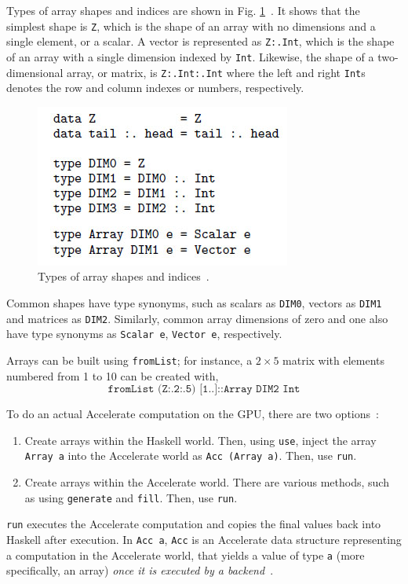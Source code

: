 Types of array shapes and indices are shown in Fig. \ref{fig:acc-types}~\cite{ChaKelLee11}. It shows that the simplest shape is \texttt{Z}, which is the shape of an array with no dimensions and a single element, or a scalar. A vector is represented as \texttt{Z:.Int}, which is the shape of an array with a single dimension indexed by \texttt{Int}. Likewise, the shape of a two-dimensional array, or matrix, is \texttt{Z:.Int:.Int} where the left and right \texttt{Int}s denotes the row and column indexes or numbers, respectively.

\begin{figure}
  \centerline{\includegraphics[width=0.5\linewidth]{accelerate-types.jpg}}
  \caption{Types of array shapes and indices~\cite{ChaKelLee11}.}
  \label{fig:acc-types}
\end{figure}

Common shapes have type synonyms, such as scalars as \texttt{DIM0}, vectors as \texttt{DIM1} and matrices as \texttt{DIM2}. Similarly, common array dimensions of zero and one also have type synonyms as \texttt{Scalar e}, \texttt{Vector e}, respectively.

Arrays can be built using \texttt{fromList}; for instance, a $2 \times 5$ matrix with elements numbered from 1 to 10 can be created with,
$$\texttt{fromList (Z:.2:.5) [1..]::Array DIM2 Int}$$

To do an actual Accelerate computation on the GPU, there are two options~\cite{Mar13}:
\begin{enumerate}
\item Create arrays within the Haskell world. Then, using \texttt{use}, inject the array \texttt{Array a} into the Accelerate world as \texttt{Acc (Array a)}. Then, use \texttt{run}.
\item Create arrays within the Accelerate world. There are various methods, such as using \texttt{generate} and \texttt{fill}. Then, use \texttt{run}.
\end{enumerate}
\texttt{run} executes the Accelerate computation and copies the final values back into Haskell after execution. In \texttt{Acc a}, \texttt{Acc} is an Accelerate data structure representing a computation in the Accelerate world, that yields a value of type \texttt{a} (more specifically, an array) \textit{once it is executed by a backend}~\cite{McD13, Mar13}. 


